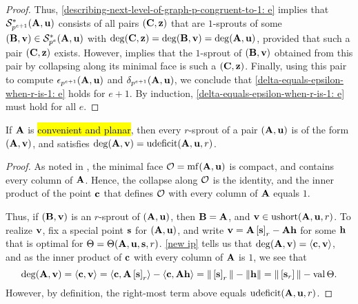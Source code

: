 \documentclass{article}
\begin{document}
\begin{proof}
Thus, \eqref{describing-next-level-of-graph-p-congruent-to-1: e} implies that $\mathcal{S}_{p^{e+1}}^{\ast}(\mathbf{A}, \mathbf{u})$ consists of all pairs $(\mathbf{C}, \mathbf{z})$ that are $1$-sprouts of some $(\mathbf{B}, \mathbf{v}) \in \mathcal{S}_{p^{e}}^{\ast}(\mathbf{A}, \mathbf{u})$ with $\deg(\mathbf{C}, \mathbf{z}) = \deg(\mathbf{B}, \mathbf{v}) = \deg(\mathbf{A}, \mathbf{u})$, provided that such a pair $(\mathbf{C}, \mathbf{z})$ exists.  However,   implies that the $1$-sprout of $(\mathbf{B}, \mathbf{v})$ obtained from this pair by collapsing along its minimal face is such a $(\mathbf{C}, \mathbf{z})$.  Finally, using this pair to compute $\epsilon_{p^{e+1}}(\mathbf{A}, \mathbf{u})$ and $\delta_{p^{e+1}}(\mathbf{A}, \mathbf{u})$, we conclude that \eqref{delta-equals-epsilon-when-r-is-1: e} holds for $e+1$.  By induction, \eqref{delta-equals-epsilon-when-r-is-1: e} must hold for all $e$.
\end{proof}

\begin{lemma}
\label{sprouts-in-convenient-planar-case: L}
If $\mathbf{A}$ is \hl{convenient and planar}, then every $r$-sprout of a pair $(\mathbf{A}, \mathbf{u})$ is of the form $(\mathbf{A}, \mathbf{v})$, and satisfies  $\operatorname{deg}(\mathbf{A},\mathbf{v}) = \operatorname{udeficit}(\mathbf{A}, \mathbf{u}, {r})$. 
\end{lemma}

\begin{proof}  As noted in ,  the minimal face $\mathcal{O} = \operatorname{mf}(\mathbf{A}, \mathbf{u})$ is compact, and contains every column of $\mathbf{A}$.  Hence, the collapse along $\mathcal{O}$ is the identity, and the inner product of the point $\mathbf{c}$ that defines $\mathcal{O}$ with every column of $\mathbf{A}$ equals $1$.

Thus, if $(\mathbf{B}, \mathbf{v})$ is an $r$-sprout of $(\mathbf{A}, \mathbf{u})$, then $\mathbf{B} = \mathbf{A}$, and $\mathbf{v} \in \operatorname{ushort}(\mathbf{A}, \mathbf{u}, {r})$.  To realize $\mathbf{v}$,  fix a special point $\mathbf{s}$ for $(\mathbf{A}, \mathbf{u})$, and write $\mathbf{v} = \mathbf{A} \left[ \mathbf{s} \right]_{{r}} - \mathbf{A} \mathbf{h}$ for some $\mathbf{h}$ that is optimal for $\Theta = \Theta(\mathbf{A}, \mathbf{u}, \mathbf{s}, {r})$.  \ref{new ip} tells us that $\deg(\mathbf{A}, \mathbf{v}) = \langle \mathbf{c}, \mathbf{v} \rangle$, and as the inner product of $\mathbf{c}$ with every column of $\mathbf{A}$ is $1$, we see that
\[ \deg(\mathbf{A}, \mathbf{v}) = \langle \mathbf{c}, \mathbf{v} \rangle = \langle \mathbf{c}, \mathbf{A} \left[ \mathbf{s} \right]_{{r}} \rangle - \langle \mathbf{c}, \mathbf{A} \mathbf{h} \rangle = \| \left[ \mathbf{s} \right]_{{r}} \| - \| \mathbf{h} \| = \| \left[ \mathbf{s}_{{r}} \right] \| - \operatorname{val} \Theta.\]
However, by definition, the right-most term above equals $\operatorname{udeficit}(\mathbf{A}, \mathbf{u}, {r})$. 
\end{proof}
\end{document}
